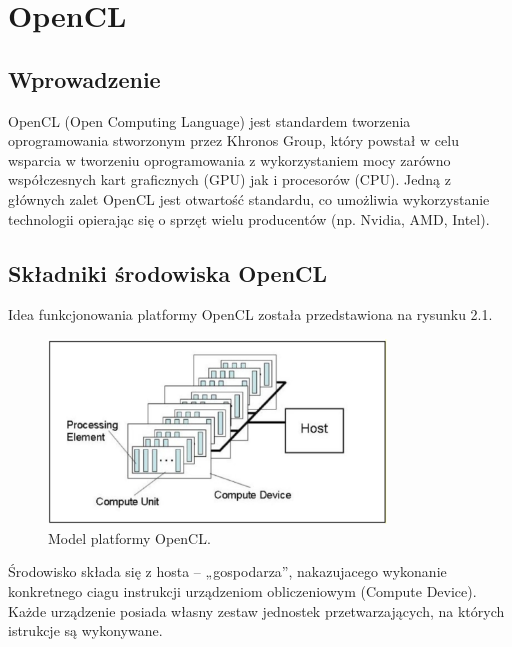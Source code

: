 \chapter{OpenCL}

\section{Wprowadzenie}
OpenCL (Open Computing Language) jest standardem tworzenia oprogramowania stworzonym przez Khronos Group, który powstał w celu wsparcia w tworzeniu oprogramowania z wykorzystaniem mocy zarówno współczesnych kart graficznych (GPU) jak i procesorów (CPU). Jedną z głównych zalet OpenCL jest otwartość standardu, co umożliwia wykorzystanie technologii opierając się o sprzęt wielu producentów (np. Nvidia, AMD, Intel).

\section{Składniki środowiska OpenCL}
Idea funkcjonowania platformy OpenCL została przedstawiona na rysunku 2.1. \\
\begin{figure}[h]
\centering
\includegraphics[width=0.8\textwidth]{figures/opencl_platform_model.png}
\caption{Model platformy OpenCL.\protect\footnotemark}%
\label{rys:OpenCL Platform Model}
\end{figure}
Środowisko składa się z hosta – „gospodarza”, nakazujacego wykonanie konkretnego ciagu instrukcji urządzeniom obliczeniowym (Compute Device). Każde urządzenie posiada własny zestaw jednostek przetwarzających, na których istrukcje są wykonywane.

